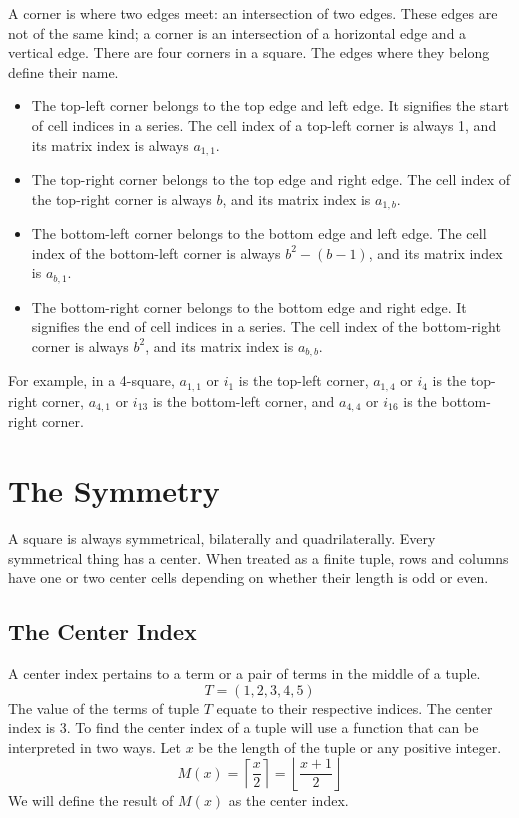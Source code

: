 \documentclass[letterpaper, twoside,12pt]{article}
\begin{document}
    A corner is where two edges meet: an intersection of two edges. These edges are not of the same kind; a corner is an intersection of a horizontal edge and a vertical edge. There are four corners in a square. The edges where they belong define their name.
    \begin{itemize}
        \item The top-left corner belongs to the top edge and left edge. It signifies the start of cell indices in a series. The cell index of a top-left corner is always 1, and its matrix index is always $a_{1,1}$.
        \item The top-right corner belongs to the top edge and right edge. The cell index of the top-right corner is always $b$, and its matrix index is $a_{1,b}$.
        \item The bottom-left corner belongs to the bottom edge and left edge. The cell index of the bottom-left corner is always $b^2 - (b - 1)$, and its matrix index is $a_{b,1}$.
        \item The bottom-right corner belongs to the bottom edge and right edge. It signifies the end of cell indices in a series. The cell index of the bottom-right corner is always $b^2$, and its matrix index is $a_{b,b}$.
    \end{itemize}

    For example, in a 4-square, $a_{1,1}$ or $i_1$ is the top-left corner, $a_{1,4}$ or $i_4$ is the top-right corner, $a_{4,1}$ or $i_{13}$ is the bottom-left corner, and $a_{4,4}$ or $i_{16}$ is the bottom-right corner.

    \newpage

    \section{The Symmetry} \label{symmetry}
    A square is always symmetrical, bilaterally and quadrilaterally. Every symmetrical thing has a center. When treated as a finite tuple, rows and columns have one or two center cells depending on whether their length is odd or even.

    \subsection{The Center Index} \label{center_index}
    A center index pertains to a term or a pair of terms in the middle of a tuple.
    \begin{equation*}
        T = (1,2,3,4,5)
    \end{equation*}
    The value of the terms of tuple $T$ equate to their respective indices. The center index is 3. To find the center index of a tuple will use a function that can be interpreted in two ways. Let $x$ be the length of the tuple or any positive integer.
    \begin{equation}
        M(x) = \left\lceil \frac{x}{2} \right\rceil = \left\lfloor \frac{x+1}{2} \right\rfloor
    \end{equation}
    We will define the result of $M(x)$ as the center index. 
\end{document}

